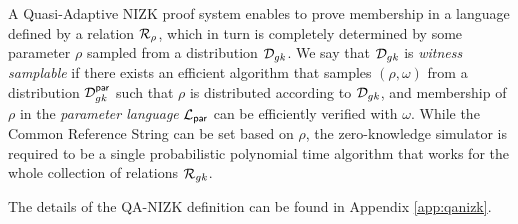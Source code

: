 A Quasi-Adaptive NIZK proof system \cite{AC:JutRoy13} enables
to prove membership in a language defined by a relation $\mathcal{R}_\rho$, which in turn is completely determined by some parameter
$\rho$ sampled from a distribution $\mathcal{D}_{gk}$.
We say that $\mathcal{D}_{gk}$ is \emph{witness samplable} if there exists an efficient
algorithm that samples $(\rho,\omega)$ from a distribution $\mathcal{D}_{gk}^{\mathsf{par}}$ such that $\rho$ is distributed according to $\mathcal{D}_{gk}$, and membership of $\rho$
in the \emph{parameter language} $\mathcal{L}_\mathsf{par}$ can be efficiently verified with $\omega$.
While the Common Reference String can be set based on $\rho$, the zero-knowledge simulator is required to be a single probabilistic polynomial time
algorithm that works for the whole collection of relations $\mathcal{R}_{gk}$. 

The details of the QA-NIZK definition can be found in Appendix \ref{app:qanizk}.
